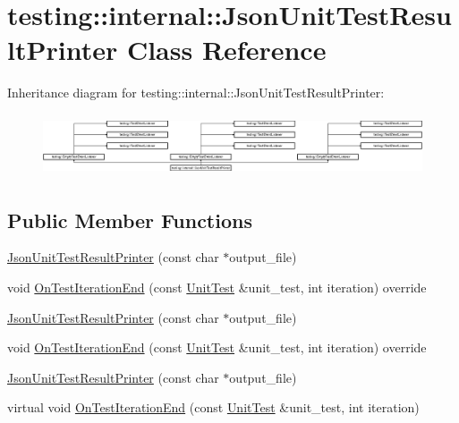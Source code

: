 \hypertarget{classtesting_1_1internal_1_1_json_unit_test_result_printer}{}\section{testing\+::internal\+::Json\+Unit\+Test\+Result\+Printer Class Reference}
\label{classtesting_1_1internal_1_1_json_unit_test_result_printer}
Inheritance diagram for testing\+::internal\+::Json\+Unit\+Test\+Result\+Printer\+:\begin{figure}[H]
\begin{center}
\leavevmode
\includegraphics[height=1.844532cm]{dd/dc6/classtesting_1_1internal_1_1_json_unit_test_result_printer}
\end{center}
\end{figure}
\subsection*{Public Member Functions}
\begin{DoxyCompactItemize}
\item 
\mbox{\hyperlink{classtesting_1_1internal_1_1_json_unit_test_result_printer_a273623decde1be18db45e95594f9d501}{Json\+Unit\+Test\+Result\+Printer}} (const char $\ast$output\+\_\+file)
\item 
void \mbox{\hyperlink{classtesting_1_1internal_1_1_json_unit_test_result_printer_a9716a1dd5a3608181748c1b6f039c365}{On\+Test\+Iteration\+End}} (const \mbox{\hyperlink{classtesting_1_1_unit_test}{Unit\+Test}} \&unit\+\_\+test, int iteration) override
\item 
\mbox{\hyperlink{classtesting_1_1internal_1_1_json_unit_test_result_printer_a273623decde1be18db45e95594f9d501}{Json\+Unit\+Test\+Result\+Printer}} (const char $\ast$output\+\_\+file)
\item 
void \mbox{\hyperlink{classtesting_1_1internal_1_1_json_unit_test_result_printer_a9716a1dd5a3608181748c1b6f039c365}{On\+Test\+Iteration\+End}} (const \mbox{\hyperlink{classtesting_1_1_unit_test}{Unit\+Test}} \&unit\+\_\+test, int iteration) override
\item 
\mbox{\hyperlink{classtesting_1_1internal_1_1_json_unit_test_result_printer_a273623decde1be18db45e95594f9d501}{Json\+Unit\+Test\+Result\+Printer}} (const char $\ast$output\+\_\+file)
\item 
virtual void \mbox{\hyperlink{classtesting_1_1internal_1_1_json_unit_test_result_printer_a937dff300da12370b9dd0a0dd82a529a}{On\+Test\+Iteration\+End}} (const \mbox{\hyperlink{classtesting_1_1_unit_test}{Unit\+Test}} \&unit\+\_\+test, int iteration)
\end{DoxyCompactItemize}
